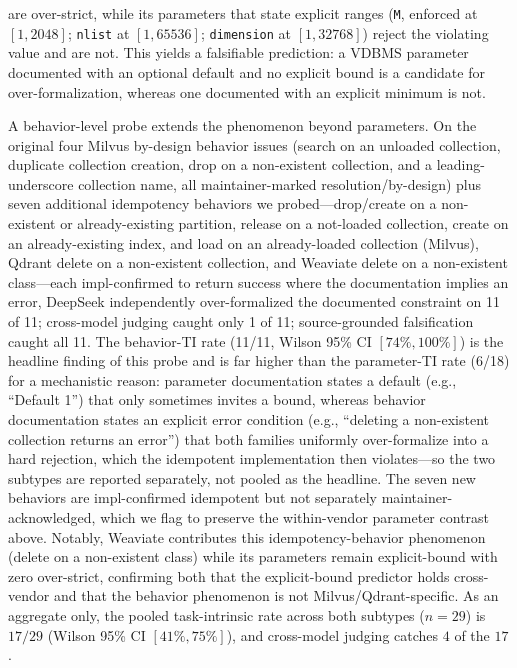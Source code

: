 \documentclass[sigconf]{acmart}
\begin{document}
are over-strict, while its parameters that state explicit ranges (\texttt{M}, enforced at $[1,2048]$; \texttt{nlist} at $[1,65536]$; \texttt{dimension} at $[1,32768]$) reject the violating value and are not. This yields a falsifiable prediction: a VDBMS parameter documented with an optional default and no explicit bound is a candidate for over-formalization, whereas one documented with an explicit minimum is not.

A behavior-level probe extends the phenomenon beyond parameters. On the original four Milvus by-design behavior issues (search on an unloaded collection, duplicate collection creation, drop on a non-existent collection, and a leading-underscore collection name, all maintainer-marked resolution/by-design) plus seven additional idempotency behaviors we probed---drop/create on a non-existent or already-existing partition, release on a not-loaded collection, create on an already-existing index, and load on an already-loaded collection (Milvus), Qdrant delete on a non-existent collection, and Weaviate delete on a non-existent class---each impl-confirmed to return success where the documentation implies an error, DeepSeek independently over-formalized the documented constraint on 11 of 11; cross-model judging caught only 1 of 11; source-grounded falsification caught all 11. The behavior-TI rate (11/11, Wilson 95\% CI $[74\%, 100\%]$) is the headline finding of this probe and is far higher than the parameter-TI rate (6/18) for a mechanistic reason: parameter documentation states a default (e.g., ``Default 1'') that only sometimes invites a bound, whereas behavior documentation states an explicit error condition (e.g., ``deleting a non-existent collection returns an error'') that both families uniformly over-formalize into a hard rejection, which the idempotent implementation then violates---so the two subtypes are reported separately, not pooled as the headline. The seven new behaviors are impl-confirmed idempotent but not separately maintainer-acknowledged, which we flag to preserve the within-vendor parameter contrast above. Notably, Weaviate contributes this idempotency-behavior phenomenon (delete on a non-existent class) while its parameters remain explicit-bound with zero over-strict, confirming both that the explicit-bound predictor holds cross-vendor and that the behavior phenomenon is not Milvus/Qdrant-specific. As an aggregate only, the pooled task-intrinsic rate across both subtypes ($n{=}29$) is $17/29$ (Wilson 95\% CI $[41\%, 75\%]$), and cross-model judging catches $4$ of the $17$.
\end{document}
